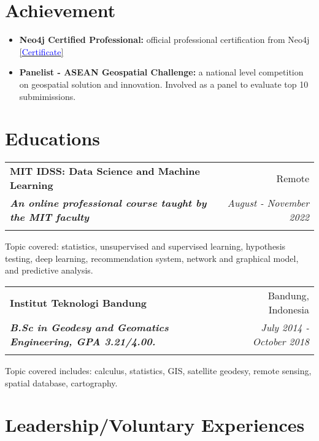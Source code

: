 \documentclass[a4paper, 11pt]{article}
\makeatletter
\newcommand{\resumeItem}[2]{
    \item\small{
        \textbf{#1}{#2 \vspace{-2pt}}
    }
}
\newcommand{\resumeSubheading}[4]{
    \vspace{-1pt}
    \begin{tabular*}{0.97\textwidth}{l@{\extracolsep{\fill}}r}
        \color{lightblue}\textbf{#1} & #2 \\
        \textbf{\textit{\small#3}} & \textit{\small #4} \\
        \textnormal{}\vspace{-5pt}
    \end{tabular*}\vspace{-5pt}
}
\newcommand{\resumeItemListStart}{\begin{itemize}[leftmargin=*]\setlength\itemsep{0em}\vspace{-1pt}}
\newcommand{\resumeItemListEnd}{\end{itemize}\vspace{-5pt}}
\makeatother
\begin{document}
    \vspace{-20pt}
    \section{Achievement}

    \resumeItemListStart
    \resumeItem{Neo4j Certified Professional:}{ official professional certification from 
    Neo4j
    \href{https://graphacademy.neo4j.com/c/4cb304b6-5a5b-4f45-96cf-1840a2982e55/}{[\textcolor{blue}{Certificate}]}}
    \resumeItem{Panelist - ASEAN Geospatial Challenge:}{ a national level competition on 
    geospatial solution and innovation. Involved as a panel to evaluate top 10 submimissions.
    }
    \resumeItemListEnd
    
    \vspace{-20pt}
    \section{Educations}

    \resumeSubheading
    {MIT IDSS: Data Science and Machine Learning}
    {Remote}
    {An online professional course taught by the MIT faculty}
    {August - November 2022}
    {Topic covered: statistics, unsupervised and supervised learning, hypothesis testing, 
    deep learning, recommendation system, network and graphical model, and predictive analysis.}
    
    \vspace{5pt}
    \resumeSubheading
    {Institut Teknologi Bandung}
    {Bandung, Indonesia}
    {B.Sc in Geodesy and Geomatics Engineering, GPA 3.21/4.00.}
    {July 2014 - October 2018}
    {Topic covered includes: calculus, statistics, GIS, satellite geodesy, 
    remote sensing, spatial database, cartography.}

    \vspace{-20pt}
    \section{Leadership/Voluntary Experiences}
\end{document}
